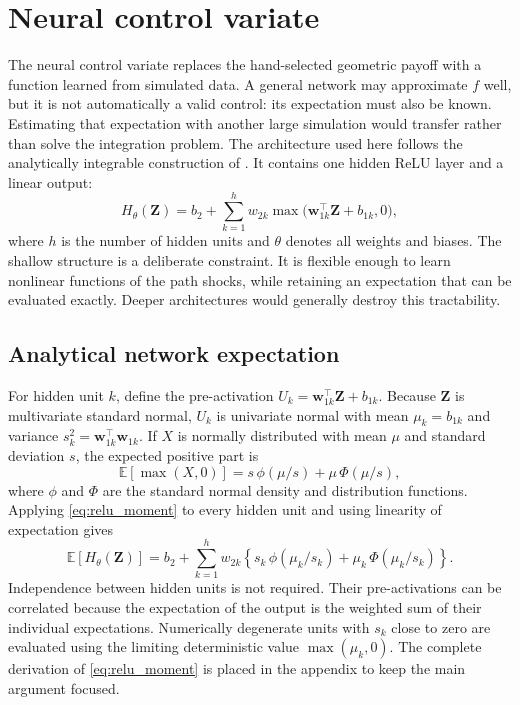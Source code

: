 \section{Neural control variate}

The neural control variate replaces the hand-selected geometric payoff with a function learned from simulated data. A general network may approximate $f$ well, but it is not automatically a valid control: its expectation must also be known. Estimating that expectation with another large simulation would transfer rather than solve the integration problem. The architecture used here follows the analytically integrable construction of \textcite{el_filali_ech-chafiq_lelong_reghai_2021}. It contains one hidden ReLU layer and a linear output:
\begin{equation}
H_{\theta}(\mathbf{Z}) = b_2 + \sum_{k=1}^{h} w_{2k} \max\bigl(\mathbf{w}_{1k}^\top \mathbf{Z} + b_{1k}, 0\bigr),
\label{eq:shallow_network}
\end{equation}
where $h$ is the number of hidden units and $\theta$ denotes all weights and biases. The shallow structure is a deliberate constraint. It is flexible enough to learn nonlinear functions of the path shocks, while retaining an expectation that can be evaluated exactly. Deeper architectures would generally destroy this tractability.

\subsection{Analytical network expectation}

For hidden unit $k$, define the pre-activation $U_k = \mathbf{w}_{1k}^\top \mathbf{Z} + b_{1k}$. Because $\mathbf{Z}$ is multivariate standard normal, $U_k$ is univariate normal with mean $\mu_k = b_{1k}$ and variance $s_k^2 = \mathbf{w}_{1k}^\top \mathbf{w}_{1k}$. If $X$ is normally distributed with mean $\mu$ and standard deviation $s$, the expected positive part is
\begin{equation}
\mathbb{E}[\max(X,0)] = s \, \phi(\mu/s) + \mu \, \Phi(\mu/s),
\label{eq:relu_moment}
\end{equation}
where $\phi$ and $\Phi$ are the standard normal density and distribution functions. Applying \eqref{eq:relu_moment} to every hidden unit and using linearity of expectation gives
\begin{equation}
\mathbb{E}[H_{\theta}(\mathbf{Z})] = b_2 + \sum_{k=1}^{h} w_{2k}\left\{s_k \, \phi(\mu_k/s_k) + \mu_k \, \Phi(\mu_k/s_k)\right\}.
\label{eq:network_expectation}
\end{equation}
Independence between hidden units is not required. Their pre-activations can be correlated because the expectation of the output is the weighted sum of their individual expectations. Numerically degenerate units with $s_k$ close to zero are evaluated using the limiting deterministic value $\max(\mu_k,0)$. The complete derivation of \eqref{eq:relu_moment} is placed in the appendix to keep the main argument focused.

